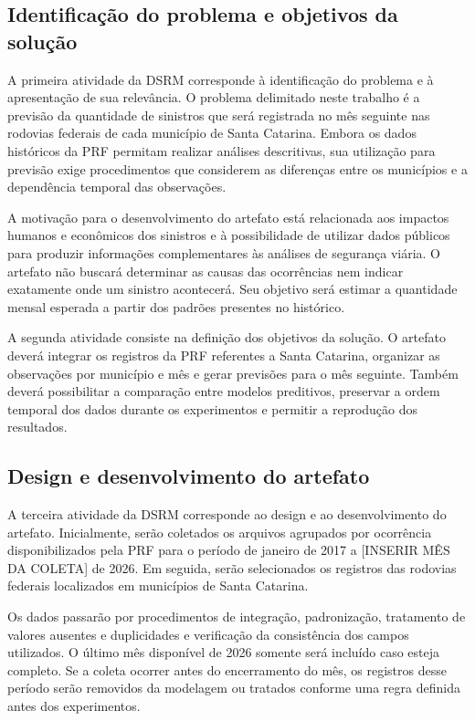 \documentclass[12pt]{article}
\begin{document}
\subsection{Identificação do problema e objetivos da solução}

A primeira atividade da DSRM corresponde à identificação do problema e à apresentação de sua relevância. O problema delimitado neste trabalho é a previsão da quantidade de sinistros que será registrada no mês seguinte nas rodovias federais de cada município de Santa Catarina. Embora os dados históricos da PRF permitam realizar análises descritivas, sua utilização para previsão exige procedimentos que considerem as diferenças entre os municípios e a dependência temporal das observações.

A motivação para o desenvolvimento do artefato está relacionada aos impactos humanos e econômicos dos sinistros e à possibilidade de utilizar dados públicos para produzir informações complementares às análises de segurança viária. O artefato não buscará determinar as causas das ocorrências nem indicar exatamente onde um sinistro acontecerá. Seu objetivo será estimar a quantidade mensal esperada a partir dos padrões presentes no histórico.

A segunda atividade consiste na definição dos objetivos da solução. O artefato deverá integrar os registros da PRF referentes a Santa Catarina, organizar as observações por município e mês e gerar previsões para o mês seguinte. Também deverá possibilitar a comparação entre modelos preditivos, preservar a ordem temporal dos dados durante os experimentos e permitir a reprodução dos resultados.

\subsection{Design e desenvolvimento do artefato}

A terceira atividade da DSRM corresponde ao design e ao desenvolvimento do artefato. Inicialmente, serão coletados os arquivos agrupados por ocorrência disponibilizados pela PRF para o período de janeiro de 2017 a [INSERIR MÊS DA COLETA] de 2026. Em seguida, serão selecionados os registros das rodovias federais localizados em municípios de Santa Catarina.

Os dados passarão por procedimentos de integração, padronização, tratamento de valores ausentes e duplicidades e verificação da consistência dos campos utilizados. O último mês disponível de 2026 somente será incluído caso esteja completo. Se a coleta ocorrer antes do encerramento do mês, os registros desse período serão removidos da modelagem ou tratados conforme uma regra definida antes dos experimentos.
\end{document}
